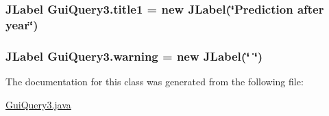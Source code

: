 \subsubsection[{\texorpdfstring{title1}{title1}}]{\setlength{\rightskip}{0pt plus 5cm}J\+Label Gui\+Query3.\+title1 = new J\+Label(\char`\"{}Prediction after year\char`\"{})\hspace{0.3cm}{\ttfamily [private]}}\hypertarget{classGuiQuery3_a9edee5c70fc9ce109601436c5556675f}{}\label{classGuiQuery3_a9edee5c70fc9ce109601436c5556675f}
\subsubsection[{\texorpdfstring{warning}{warning}}]{\setlength{\rightskip}{0pt plus 5cm}J\+Label Gui\+Query3.\+warning = new J\+Label(\char`\"{} \char`\"{})\hspace{0.3cm}{\ttfamily [private]}}\hypertarget{classGuiQuery3_a2452813fd6a5ff8c945ccadde7ad4853}{}\label{classGuiQuery3_a2452813fd6a5ff8c945ccadde7ad4853}


The documentation for this class was generated from the following file\+:\begin{DoxyCompactItemize}
\item 
\hyperlink{GuiQuery3_8java}{Gui\+Query3.\+java}\end{DoxyCompactItemize}
